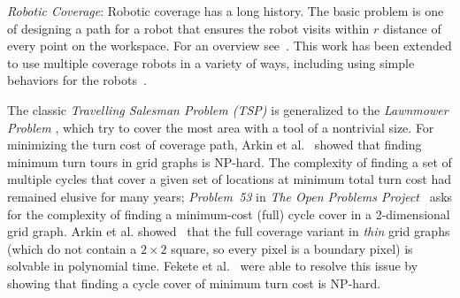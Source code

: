 \noindent \emph{Robotic Coverage}: 
Robotic coverage has a long history. The basic problem is one of designing a path for a robot that ensures the robot visits within $r$ distance of every point on the workspace.  For an overview see~\cite{Choset2001}.  This work has been extended to use multiple coverage robots in a variety of ways, including using simple behaviors for the robots~\cite{spears2006physics,Koenig2001}.

The classic \emph{Travelling Salesman Problem (TSP)} is generalized to the \emph{Lawnmower Problem} \cite{arkin2000approximation}, which try to cover the most area with a tool of a nontrivial size.
For minimizing the turn cost of coverage path, Arkin et al.~\cite{arkin2005optimal} showed that finding minimum turn tours in grid graphs is NP-hard.
The complexity of finding a set of multiple cycles that cover a given set of locations at minimum total turn cost had remained elusive for many years; \emph{Problem~{53}} in \emph{The Open Problems Project}~\cite{openproblemproject} asks for the complexity of finding a minimum-cost (full) cycle cover in a 2-dimensional grid graph.
Arkin et al. showed~\cite{arkin2005optimal,arkin2001optimal} that the full coverage variant in {\em thin} grid graphs (which do not contain a $2\times 2$ square,
so every pixel is a boundary pixel) is solvable in polynomial time. Fekete et al.~\cite{dom3} were able to resolve this issue by showing that finding a cycle cover of minimum turn cost is  NP-hard.
